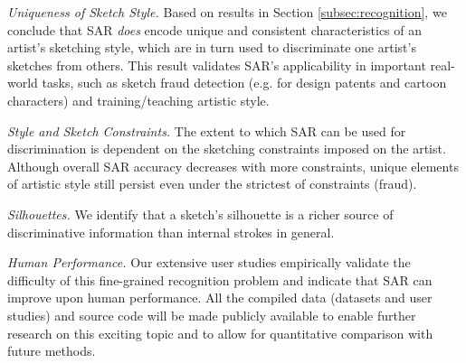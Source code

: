 \emph{Uniqueness of Sketch Style.} Based on results in Section \ref{subsec:recognition}, we conclude that SAR \emph{does} encode unique and consistent characteristics of an artist's sketching style, which are in turn used to discriminate one artist's sketches from others. This result validates SAR's applicability in important real-world tasks, such as sketch fraud detection (e.g. for design patents and cartoon characters) and training/teaching artistic style.

\emph{Style and Sketch Constraints.} The extent to which SAR can be used for discrimination is dependent on the sketching constraints imposed on the artist. Although overall SAR accuracy decreases with more constraints, unique elements of artistic style still persist even under the strictest of constraints (fraud).

\emph{Silhouettes.} We identify that a sketch's silhouette is a richer source of discriminative information than internal strokes in general. %

\emph{Human Performance.} Our extensive user studies empirically validate the difficulty of this fine-grained recognition problem and indicate that SAR can improve upon human performance. All the compiled data (datasets and user studies) and source code will be made publicly available to enable further research on this exciting topic and to allow for quantitative comparison with future methods.






